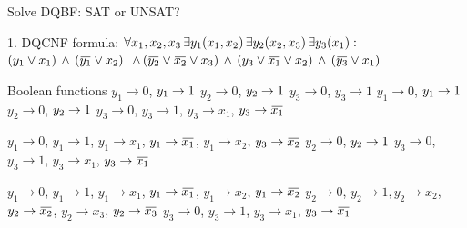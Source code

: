 \documentclass[xcolor=table	]{beamer}
\newcommand{\ov}[1]{\mkern 1.5mu\overline{\mkern-1.5mu#1\mkern-1.5mu}\mkern 1.5mu}
\begin{document}
\begin{frame}{Solve DQBF: SAT or UNSAT?}


\begin{alertblock}{1. DQCNF formula:}
	{
		$\forall x_1,x_2,x_3 \, \exists y_1(x_1,x_2) \, \exists y_2(x_2,x_3) \, \exists y_3(x_1) : \newline$
		$(y_{1} \vee x_1) \, \wedge \, (\ov{y_1} \vee x_2)  \newline$ 
		$ \, \wedge \, (\ov{y_2} \vee \ov{x_2} \vee x_3)  \newline \, \wedge \, (y_3 \vee \ov{x_1} \vee x_2) \, \wedge \, (\ov{y_3} \vee x_1)$
		\vspace{0.2cm}
	}
\end{alertblock}

\begin{block}{Boolean functions}
  {
$y_1 \to 0$, $ y_1 \to 1 \newline$
$y_2 \to 0$, $ y_2 \to 1 \newline$
$y_3 \to 0$, $ y_3 \to 1$
}
  {
	$y_1 \to 0$, $ y_1 \to 1 \newline$
	$y_2 \to 0$, $ y_2 \to 1 \newline$
	$y_3 \to 0$, $ y_3 \to 1$, $y_3 \to x_1$, $ y_3 \to \ov{x_1}$ 
}

 {
	$y_1 \to 0$, $ y_1 \to 1$, $y_1 \to x_1$, $ y_1 \to \ov{x_1}$, $y_1 \to x_2$, $ y_3 \to \ov{x_2} \newline$
	$y_2 \to 0$, $ y_2 \to 1 \newline$
	$y_3 \to 0$, $ y_3 \to 1$, $y_3 \to x_1$, $ y_3 \to \ov{x_1}$ 
}

 {
	$y_1 \to 0$, $ y_1 \to 1$, $y_1 \to x_1$, $ y_1 \to \ov{x_1}$, $y_1 \to x_2$, $ y_1 \to \ov{x_2} \newline$
	$y_2 \to 0$, $ y_2 \to 1, y_2 \to x_2$, $ y_2 \to \ov{x_2}$, $y_2 \to x_3$, $ y_2 \to \ov{x_3} \newline$
	$y_3 \to 0$, $ y_3 \to 1$, $y_3 \to x_1$, $ y_3 \to \ov{x_1}$ 
}
\end{block}

\end{frame}
\end{document}
